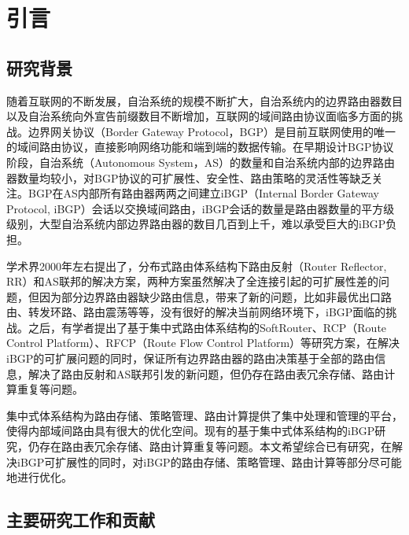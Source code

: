 \chapter{引言}
\label{cha:intro}


\section{研究背景}

随着互联网的不断发展，自治系统的规模不断扩大，自治系统内的边界路由器数目以及自治系统向外宣告前缀数目不断增加，互联网的域间路由协议面临多方面的挑战。边界网关协议（Border Gateway Protocol，BGP）是目前互联网使用的唯一的域间路由协议，直接影响网络功能和端到端的数据传输。在早期设计BGP协议阶段，自治系统（Autonomous System，AS）的数量和自治系统内部的边界路由器数量均较小，对BGP协议的可扩展性、安全性、路由策略的灵活性等缺乏关注。BGP在AS内部所有路由器两两之间建立iBGP（Internal Border Gateway Protocol, iBGP）会话以交换域间路由，iBGP会话的数量是路由器数量的平方级级别，大型自治系统内部边界路由器的数目几百到上千，难以承受巨大的iBGP负担。

学术界2000年左右提出了，分布式路由体系结构下路由反射（Router Reflector, RR）和AS联邦的解决方案，两种方案虽然解决了全连接引起的可扩展性差的问题，但因为部分边界路由器缺少路由信息，带来了新的问题，比如非最优出口路由、转发环路、路由震荡等等，没有很好的解决当前网络环境下，iBGP面临的挑战。之后，有学者提出了基于集中式路由体系结构的SoftRouter、RCP（Route Control Platform）、RFCP（Route Flow Control Platform）等研究方案，在解决iBGP的可扩展问题的同时，保证所有边界路由器的路由决策基于全部的路由信息，解决了路由反射和AS联邦引发的新问题，但仍存在路由表冗余存储、路由计算重复等问题。

集中式体系结构为路由存储、策略管理、路由计算提供了集中处理和管理的平台，使得内部域间路由具有很大的优化空间。现有的基于集中式体系结构的iBGP研究，仍存在路由表冗余存储、路由计算重复等问题。本文希望综合已有研究，在解决iBGP可扩展性的同时，对iBGP的路由存储、策略管理、路由计算等部分尽可能地进行优化。

\section{主要研究工作和贡献}

